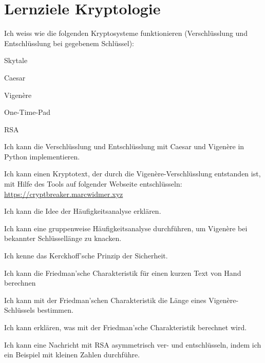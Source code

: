 \chapter{Lernziele Kryptologie}

\begin{todolist}
\item Ich weiss wie die folgenden Kryptosysteme funktionieren (Verschlüsslung und Entschlüsslung bei gegebenem Schlüssel):
  \begin{todolist}
  \item Skytale 
  \item Caesar
  \item Vigenère
  \item One-Time-Pad
  \item RSA
  \end{todolist}
\item Ich kann die Verschlüsslung und Entschlüsslung mit Caesar und Vigenère in Python implementieren.
\item Ich kann einen Kryptotext, der durch die Vigenère-Verschlüsslung entstanden ist, mit Hilfe des Tools auf folgender Webseite entschlüsseln: \\
\url{https://cryptbreaker.marcwidmer.xyz}
\item Ich kann die Idee der Häufigkeitsanalyse erklären.
\item Ich kann eine gruppenweise Häufigkeitsanalyse durchführen, um Vigenère bei bekannter Schlüssellänge zu knacken.
\item Ich kenne das Kerckhoff’sche Prinzip der Sicherheit.
\item Ich kann die Friedman’sche Charakteristik für einen kurzen Text von Hand berechnen
\item Ich kann mit der Friedman'schen Charakteristik die Länge eines Vigenère-Schlüssels bestimmen.
\item Ich kann erklären, was mit der Friedman’sche Charakteristik berechnet wird.
\item Ich kann eine Nachricht mit RSA asymmetrisch ver- und entschlüsseln, indem ich ein Beispiel mit kleinen Zahlen durchführe.
\end{todolist}
